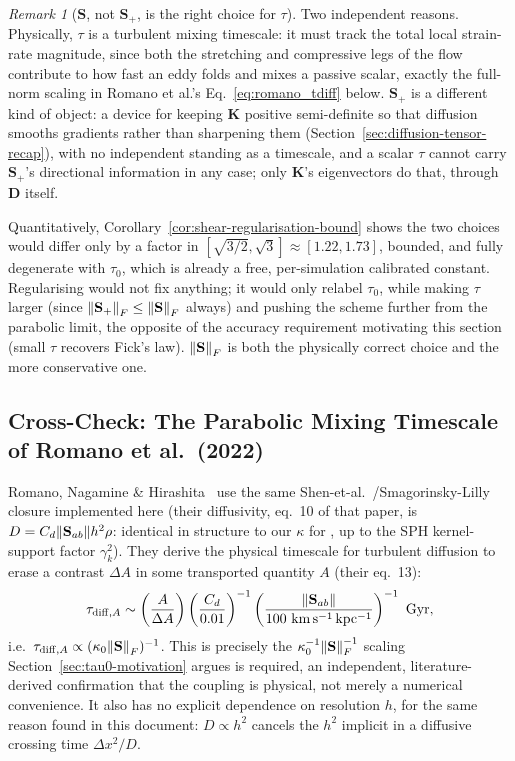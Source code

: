 \documentclass[11pt, a4paper, parskip]{scrartcl}
\newcommand{\code}[1]{\texttt{\seqsplit{#1}}}
\theoremstyle{plain}
\theoremstyle{definition}
\theoremstyle{remark}
\newtheorem{remark}{Remark}
\newcommand{\Kmat}{\mathbf{K}}                            %
\newcommand{\Shear}{\mathbf{S}}                           %
\newcommand{\Splus}{\mathbf{S}_{+}}                       %
\newcommand{\kappaC}{\kappa_{0}}                          %
\newcommand{\kappaP}{\kappa}                              %
\newcommand{\gammak}{\gamma_{k}}                          %
\newcommand{\dx}{\Delta x}                                %
\newcommand{\taurelax}{\tau}                              %
\newcommand{\Deff}{\mathbf{D}}                            %
\begin{document}
\begin{remark}[$\Shear$, not $\Splus$, is the right choice for $\taurelax$]
\label{rem:no-shear-regularisation-in-tau}
Two independent reasons. Physically, $\taurelax$ is a turbulent mixing
timescale: it must track the total local strain-rate magnitude, since both
the stretching and compressive legs of the flow contribute to how fast an
eddy folds and mixes a passive scalar, exactly the full-norm scaling in
Romano et al.'s Eq.~\eqref{eq:romano_tdiff} below. $\Splus$ is a different
kind of object: a device for keeping $\Kmat$ positive semi-definite so
that diffusion smooths gradients rather than sharpening them
(Section~\ref{sec:diffusion-tensor-recap}), with no independent standing
as a timescale, and a scalar $\taurelax$ cannot carry $\Splus$'s
directional information in any case; only $\Kmat$'s eigenvectors do that,
through $\Deff$ itself.

Quantitatively, Corollary~\ref{cor:shear-regularisation-bound} shows the
two choices would differ only by a factor in
$[\sqrt{3/2},\sqrt3]\approx[1.22,1.73]$, bounded, and fully degenerate
with $\taurelax_0$, which is already a free, per-simulation calibrated
constant. Regularising would not fix anything; it would only relabel
$\taurelax_0$, while making $\taurelax$ larger (since
$\norm{\Splus}_F\leq\norm{\Shear}_F$ always) and pushing the scheme
further from the parabolic limit, the opposite of the accuracy
requirement motivating this section (small $\taurelax$ recovers Fick's
law). $\norm{\Shear}_F$ is both the physically correct choice and the more
conservative one.
\end{remark}

\subsection{Cross-Check: The Parabolic Mixing Timescale of Romano et al.~(2022)}
Romano, Nagamine \& Hirashita~\citeyear{Romano2022} use the same
Shen-et-al.~\citeyear{ShenWadsleyStinson2010}/Smagorinsky-Lilly~\citeyear{Smagorinsky1963}
closure implemented here (their diffusivity, eq.~10 of that paper, is
$D=C_d\norm{\Shear_{ab}}h^2\rho$: identical in structure to our
$\kappaP$ for \code{isotropic\_smagorinsky}, up to the SPH kernel-support
factor $\gammak^2$). They derive the physical timescale for turbulent
diffusion to erase a contrast $\Delta A$ in some transported quantity $A$
(their eq.~13):
\begin{equation}
  \label{eq:romano_tdiff}
  \taurelax_{{\rm diff},A} \sim \left(\frac{A}{\Delta A}\right)
  \left(\frac{C_d}{0.01}\right)^{-1}
  \left(\frac{\norm{\Shear_{ab}}}{100\ {\rm km\,s^{-1}\,kpc^{-1}}}\right)^{-1}\ {\rm Gyr} ,
\end{equation}
i.e.\ $\taurelax_{{\rm diff},A}\propto(\kappaC\norm{\Shear}_F)^{-1}$. This
is precisely the $\kappaC^{-1}\norm{\Shear}_F^{-1}$ scaling
Section~\ref{sec:tau0-motivation} argues is required, an independent,
literature-derived confirmation that the coupling is physical, not merely
a numerical convenience. It also has no explicit dependence on resolution
$h$, for the same reason found in this document: $D\propto h^2$ cancels
the $h^2$ implicit in a diffusive crossing time $\dx^2/D$.
\end{document}
